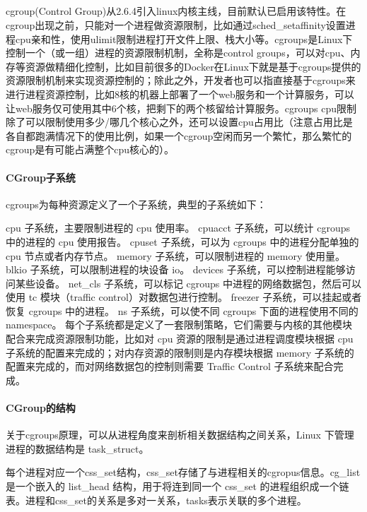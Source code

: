 \documentclass[../../../interview-questions.tex]{subfiles}
\begin{document}
\subsection{\color{red}{容器三把斧之cgroup原理与实现}}

cgroup(Control Group)从2.6.4引入linux内核主线，目前默认已启用该特性。在cgroup出现之前，只能对一个进程做资源限制，比如通过sched\_setaffinity设置进程cpu亲和性，使用ulimit限制进程打开文件上限、栈大小等。cgroups是Linux下控制一个（或一组）进程的资源限制机制，全称是control groups，可以对cpu、内存等资源做精细化控制，比如目前很多的Docker在Linux下就是基于cgroups提供的资源限制机制来实现资源控制的；除此之外，开发者也可以指直接基于cgroups来进行进程资源控制，比如8核的机器上部署了一个web服务和一个计算服务，可以让web服务仅可使用其中6个核，把剩下的两个核留给计算服务。cgroups cpu限制除了可以限制使用多少/哪几个核心之外，还可以设置cpu占用比（注意占用比是各自都跑满情况下的使用比例，如果一个cgroup空闲而另一个繁忙，那么繁忙的cgroup是有可能占满整个cpu核心的）。

\paragraph{CGroup子系统}

cgroups为每种资源定义了一个子系统，典型的子系统如下：

cpu 子系统，主要限制进程的 cpu 使用率。
cpuacct 子系统，可以统计 cgroups 中的进程的 cpu 使用报告。
cpuset 子系统，可以为 cgroups 中的进程分配单独的 cpu 节点或者内存节点。
memory 子系统，可以限制进程的 memory 使用量。
blkio 子系统，可以限制进程的块设备 io。
devices 子系统，可以控制进程能够访问某些设备。
net\_cls 子系统，可以标记 cgroups 中进程的网络数据包，然后可以使用 tc 模块（traffic control）对数据包进行控制。
freezer 子系统，可以挂起或者恢复 cgroups 中的进程。
ns 子系统，可以使不同 cgroups 下面的进程使用不同的 namespace。
每个子系统都是定义了一套限制策略，它们需要与内核的其他模块配合来完成资源限制功能，比如对 cpu 资源的限制是通过进程调度模块根据 cpu 子系统的配置来完成的；对内存资源的限制则是内存模块根据 memory 子系统的配置来完成的，而对网络数据包的控制则需要 Traffic Control 子系统来配合完成。

\paragraph{CGroup的结构}

关于cgroups原理，可以从进程角度来剖析相关数据结构之间关系，Linux 下管理进程的数据结构是 task\_struct。

每个进程对应一个css\_set结构，css\_set存储了与进程相关的cgropus信息。cg\_list是一个嵌入的 list\_head 结构，用于将连到同一个 css\_set 的进程组织成一个链表。进程和css\_set的关系是多对一关系，tasks表示关联的多个进程。
\end{document}

